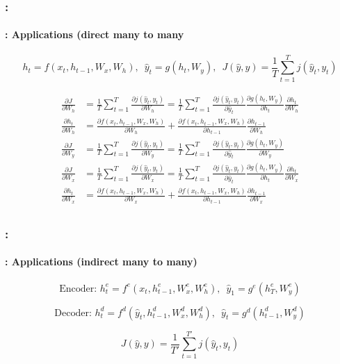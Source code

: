 \documentclass[xcolor=table]{beamer}
\begin{document}
\begin{frame}
	\frametitle{\insertshortsubtitle: \insertsection}
	\framesubtitle{\insertsubsection: Applications (direct many to many}
	\[ h_t = f(x_t, h_{t-1}, W_x, W_h),\,\,\, \hat{y}_t = g(h_t, W_y),\,\,\,  J(\hat{y}, y) = \frac{1}{T} \sum_{t=1}^{T} j(\hat{y}_t, y_t)\]

	\begin{minipage}{0.6\textwidth}\scriptsize
		\begin{align*}
			\frac{\partial J}{\partial W_h} & = \frac{1}{T} \sum_{t=1}^{T} \frac{\partial j(\hat{y}_t, y_t)}{\partial W_h}
			= \frac{1}{T} \sum_{t=1}^{T} \frac{\partial j(\hat{y}_t, y_t)}{\partial \hat{y}_t} 
			\frac{\partial g(h_t, W_y)}{\partial h_t} 
			\frac{\partial h_t}{\partial W_h} \\
			\frac{\partial h_t}{\partial W_h} & = 
			\frac{\partial f(x_t, h_{t-1}, W_x, W_h)}{\partial W_h} + 
			\frac{\partial f(x_t, h_{t-1}, W_x, W_h)}{\partial h_{t-1}} \frac{\partial h_{t-1}}{\partial W_h} \\
			\frac{\partial J}{\partial W_y} & =
			\frac{1}{T} \sum_{t=1}^{T} \frac{\partial j(\hat{y}_t, y_t)}{\partial W_y}
			= \frac{1}{T} \sum_{t=1}^{T} \frac{\partial j(\hat{y}_t, y_t)}{\partial \hat{y}_t} 
			\frac{\partial g(h_t, W_y)}{\partial W_y} \\
			\frac{\partial J}{\partial W_x} & = 
			\frac{1}{T} \sum_{t=1}^{T} \frac{\partial j(\hat{y}_t, y_t)}{\partial W_x}
			= \frac{1}{T} \sum_{t=1}^{T} \frac{\partial j(\hat{y}_t, y_t)}{\partial \hat{y}_t} 
			\frac{\partial g(h_t, W_y)}{\partial h_t} 
			\frac{\partial h_t}{\partial W_x} \\
			\frac{\partial h_t}{\partial W_x} & = 
			\frac{\partial f(x_t, h_{t-1}, W_x, W_h)}{\partial W_x} + 
			\frac{\partial f(x_t, h_{t-1}, W_x, W_h)}{\partial h_{t-1}} \frac{\partial h_{t-1}}{\partial W_x} \\
		\end{align*}
	\end{minipage}
	\begin{minipage}{0.38\textwidth}
	\end{minipage}
	
\end{frame}

\begin{frame}
	\frametitle{\insertshortsubtitle: \insertsection}
	\framesubtitle{\insertsubsection: Applications (indirect many to many)}
	
	\vskip-12pt

	\[ \text{Encoder: } h^e_t = f^e(x_t, h^e_{t-1}, W^e_x, W^e_h), \,\,\, \hat{y}_1 = g^e(h^e_{T}, W_y^e)\]
	
	\[ \text{Decoder: } h^d_{t} = f^d(\hat{y}_{t}, h^d_{t-1}, W^d_x, W^d_h), \,\,\, \hat{y}_{t} = g^d(h^d_{t-1}, W^d_y)\]

	\[ J(\hat{y}, y) = \frac{1}{T'} \sum_{t=1}^{T'} j(\hat{y}_{t}, y_t)\]
	
	\begin{center}
	\end{center}
\end{frame}
\end{document}
